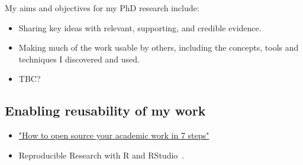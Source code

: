 My aims and objectives for my PhD research include:
\begin{itemize}
    \item Sharing key ideas with relevant, supporting, and credible evidence.
    \item Making much of the work usable by others, including the concepts, tools and techniques I discovered and used.
    \item TBC?
\end{itemize}

\subsection{Enabling reusability of my work}

\begin{itemize}
    \item \href{https://opensource.com/article/19/9/how-open-source-academic-work}{"How to open source your academic work in 7 steps"}
    \item Reproducible Research with R and RStudio~\cite{gandrud2020reproducible}.
\end{itemize}


